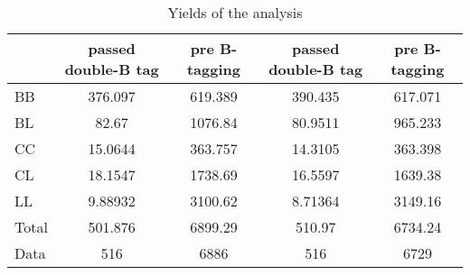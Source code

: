 \documentclass[10pt]{article}
\begin{document}
\begin{table}[htbp]
\begin{center}
\begin{tabular}{|l|S|S|S|S|}
\hline 
 & {passed double-B tag} & {pre B-tagging} & {passed double-B tag} & {pre B-tagging}\\
\hline 
  BB   & 376.097  & 619.389  & 390.435  & 617.071  \\ 
  BL   & 82.67  & 1076.84  & 80.9511  & 965.233  \\ 
  CC   & 15.0644  & 363.757  & 14.3105  & 363.398  \\ 
  CL   & 18.1547  & 1738.69  & 16.5597  & 1639.38  \\ 
  LL   & 9.88932  & 3100.62  & 8.71364  & 3149.16  \\ 
\hline 
  Total  & 501.876  & 6899.29  & 510.97  & 6734.24  \\ 
\hline 
  Data   & 516 & 6886 & 516 & 6729 \\ 
\hline 
\end{tabular} 
\caption{Yields of the analysis} 
\end{center} 
\end{table} 
\end{document}
